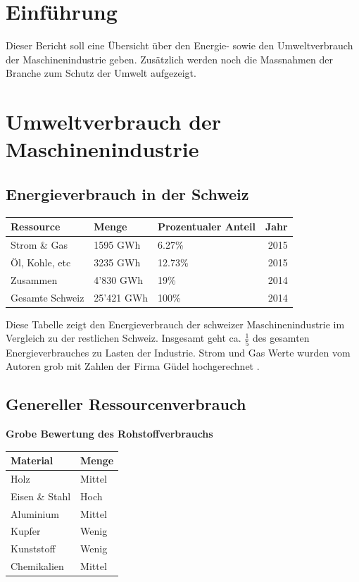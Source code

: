 \section{Einführung}
\label{sec:org7ca50ad}
Dieser Bericht soll eine Übersicht über den Energie- sowie den
Umweltverbrauch der Maschinenindustrie geben. Zusätzlich werden
noch die Massnahmen der Branche zum Schutz der Umwelt aufgezeigt.

\section{Umweltverbrauch der Maschinenindustrie}
\label{sec:org50f831e}
\subsection{Energieverbrauch in der Schweiz}
\label{sec:org885fcfa}

\begin{center}
\begin{tabular}{lllr}
Ressource & Menge & Prozentualer Anteil & Jahr\\
\hline
Strom \& Gas & 1595 GWh & 6.27\% & 2015\\
Öl, Kohle, etc & 3235 GWh & 12.73\% & 2015\\
Zusammen & 4'830 GWh \cite{ref7} & 19\% \cite{ref1} & 2014\\
\hline
Gesamte Schweiz & 25'421 GWh & 100\% & 2014\\
\end{tabular}

\end{center}

Diese Tabelle zeigt den Energieverbrauch der schweizer Maschinenindustrie
im Vergleich zu der restlichen Schweiz. Insgesamt geht
ca. \(\frac{1}{5}\) des gesamten Energieverbrauches zu Lasten der Industrie.
Strom und Gas Werte wurden vom Autoren grob mit Zahlen der Firma Güdel
hochgerechnet \cite{ref8}.
\newpage
\subsection{Genereller Ressourcenverbrauch}
\label{sec:orgacab74d}

\textbf{Grobe Bewertung des Rohstoffverbrauchs}
\begin{center}
\begin{tabular}{ll}
Material & Menge\\
\hline
Holz & Mittel\\
Eisen \& Stahl & Hoch\\
Aluminium & Mittel\\
Kupfer & Wenig\\
Kunststoff & Wenig\\
Chemikalien & Mittel\\
\end{tabular}

\end{center}

